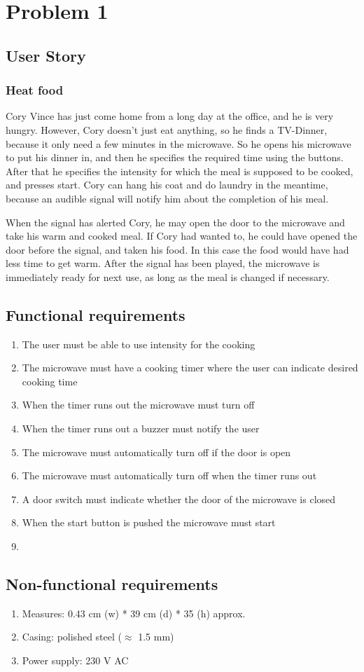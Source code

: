 \chapter{Problem 1}
\label{chp:intro}
\section{User Story}
\subsection{Heat food}
Cory Vince has just come home from a long day at the office, and he is very hungry. However, Cory doesn’t just eat anything, so he finds a TV-Dinner, because it only need a few minutes in the microwave. So he opens his microwave to put his dinner in, and then he specifies the required time using the buttons. After that he specifies the intensity for which the meal is supposed to be cooked, and presses start. Cory can hang his coat and do laundry in the meantime, because an audible signal will notify him about the completion of his meal.

When the signal has alerted Cory, he may open the door to the microwave and take his warm and cooked meal. If Cory had wanted to, he could have opened the door before the signal, and taken his food. In this case the food would have had less time to get warm. After the signal has been played, the microwave is immediately ready for next use, as long as the meal is changed if necessary.

\section{Functional requirements}

\begin{enumerate}[label=FR-\arabic*:]

\item The user must be able to use intensity for the cooking
\item The microwave must have a cooking timer where the user can indicate desired cooking time
\item When the timer runs out the microwave must turn off
\item When the timer runs out a buzzer must notify the user
\item The microwave must automatically turn off if the door is open
\item The microwave must automatically turn off when the timer runs out
\item A door switch must indicate whether the door of the microwave is closed
\item When the start button is pushed the microwave must start
\item 

\end{enumerate}

\section{Non-functional requirements}

\begin{enumerate}[label=NFR-\arabic*:]
 \item Measures: 0.43 cm (w) * 39 cm (d) * 35 (h) approx.
 \item Casing: polished steel ($\approx$ 1.5 mm)
 \item Power supply: 230 V AC
\end{enumerate}
